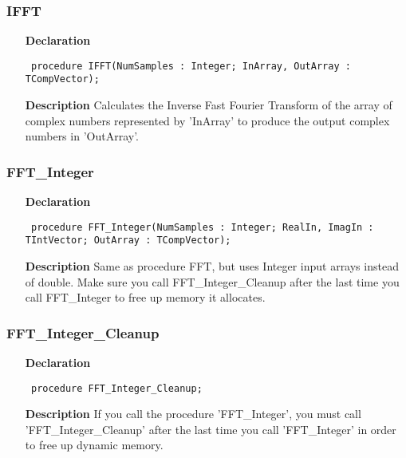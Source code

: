 \documentclass[12pt,a4paper,oneside]{report}
\newcommand{\declarationitem}[1]{\textbf{#1}}
\newcommand{\descriptiontitle}[1]{\textbf{#1}}
\newcommand{\code}[1]{\texttt{#1}}
\begin{document}
\subsubsection{IFFT}
\label{ufft-IFFT}
\begin{itemize}\item[\declarationitem{Declaration}\hfill]
	\begin{flushleft}
		\code{
			procedure IFFT(NumSamples : Integer; InArray, OutArray : TCompVector);}
		
	\end{flushleft}
	
	\par
	\item[\descriptiontitle{Description}]
	Calculates the Inverse Fast Fourier Transform of the array of complex numbers represented by 'InArray' to produce the output complex numbers in 'OutArray'.
	
\end{itemize}
\subsubsection{FFT{\_}Integer}
\label{ufft-FFT_Integer}
\begin{itemize}\item[\declarationitem{Declaration}\hfill]
	\begin{flushleft}
		\code{
			procedure FFT{\_}Integer(NumSamples : Integer; RealIn, ImagIn : TIntVector; OutArray : TCompVector);}
		
	\end{flushleft}
	
	\par
	\item[\descriptiontitle{Description}]
	Same as procedure FFT, but uses Integer input arrays instead of double. Make sure you call FFT{\_}Integer{\_}Cleanup after the last time you call FFT{\_}Integer to free up memory it allocates.
	
\end{itemize}
\subsubsection{FFT{\_}Integer{\_}Cleanup}
\label{ufft-FFT_Integer_Cleanup}
\begin{itemize}\item[\declarationitem{Declaration}\hfill]
	\begin{flushleft}
		\code{
			procedure FFT{\_}Integer{\_}Cleanup;}
		
	\end{flushleft}
	
	\par
	\item[\descriptiontitle{Description}]
	If you call the procedure 'FFT{\_}Integer', you must call 'FFT{\_}Integer{\_}Cleanup' after the last time you call 'FFT{\_}Integer' in order to free up dynamic memory.
	
\end{itemize}
\end{document}
